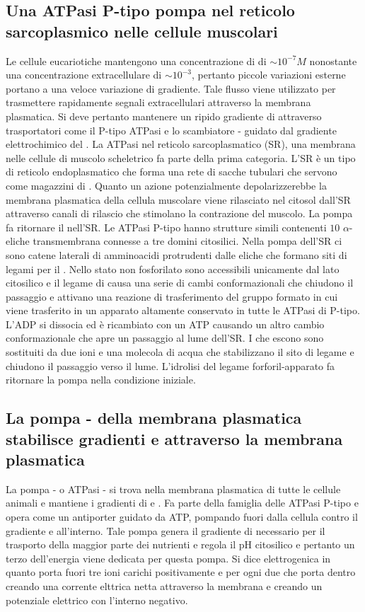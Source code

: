 \subsection{Una ATPasi P-tipo pompa  nel reticolo sarcoplasmico nelle cellule muscolari}
Le cellule eucariotiche mantengono una concentrazione di  di $\sim 10^{-7}M$ nonostante una concentrazione extracellulare di $\sim 10^{-3}$, pertanto piccole variazioni 
esterne portano a una veloce variazione di gradiente. Tale flusso viene utilizzato per trasmettere rapidamente segnali extracellulari attraverso la membrana plasmatica. Si deve pertanto
mantenere un ripido gradiente di  attraverso trasportatori come il P-tipo  ATPasi e lo scambiatore - guidato dal gradiente elettrochimico del
. La  ATPasi nel reticolo sarcoplasmatico (SR), una membrana nelle cellule di muscolo scheletrico fa parte della prima categoria. L'SR \`e un tipo di reticolo
endoplasmatico che forma una rete di sacche tubulari che servono come magazzini di . Quanto un azione potenzialmente depolarizzerebbe la membrana plasmatica della cellula
muscolare  viene rilasciato nel citosol dall'SR attraverso canali di rilascio che stimolano la contrazione del muscolo. La pompa  fa ritornare il  
nell'SR. Le ATPasi P-tipo hanno strutture simili contenenti $10$ $\alpha$-eliche transmembrana connesse a tre domini citosilici. Nella pompa dell'SR ci sono catene laterali 
di amminoacidi protrudenti dalle eliche che formano siti di legami per il . Nello stato non fosforilato sono accessibili unicamente dal lato citosilico e il legame di 
 causa una serie di cambi conformazionali che chiudono il passaggio e attivano una reazione di trasferimento del gruppo formato in cui viene trasferito in un apparato 
altamente conservato in tutte le ATPasi di P-tipo. L'ADP si dissocia ed \`e ricambiato con un ATP causando un altro cambio conformazionale che apre un passaggio al lume dell'SR. I 
 che escono sono sostituiti da due ioni  e una molecola di acqua che stabilizzano il sito di legame e chiudono il passaggio verso il lume. L'idrolisi del legame
forforil-apparato fa ritornare la pompa nella condizione iniziale. 
\subsection{La pompa - della membrana plasmatica stabilisce gradienti  e  attraverso la membrana plasmatica}
La pompa - o ATPasi - si trova nella membrana plasmatica di tutte le cellule animali e mantiene i gradienti di  e . Fa parte della famiglia
delle ATPasi P-tipo e opera come un antiporter guidato da ATP, pompando  fuori dalla cellula contro il gradiente e  all'interno. Tale pompa genera il gradiente di 
necessario per il trasporto della maggior parte dei nutrienti e regola il pH citosilico e pertanto un terzo dell'energia viene dedicata per questa pompa. Si dice elettrogenica in quanto
porta fuori tre ioni carichi positivamente e per ogni due che porta dentro creando una corrente elttrica netta attraverso la membrana e creando un potenziale elettrico con l'interno 
negativo. 
